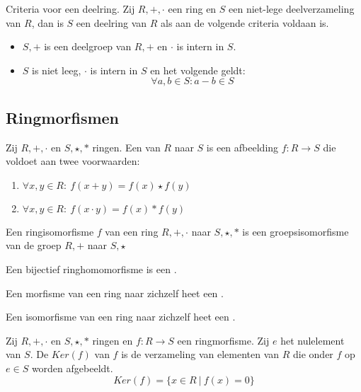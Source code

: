 \documentclass[main.tex]{subfiles}
\begin{document}
\begin{st}
  \label{st:deelring-criteria}
  Criteria voor een deelring.
  Zij $R,+,\cdot$ een ring en $S$ een niet-lege deelverzameling van $R$, dan is $S$ een deelring van $R$ als aan de volgende criteria voldaan is.
  \begin{itemize}
  \item $S,+$ is een deelgroep van $R,+$ en $\cdot$ is intern in $S$.
  \item $S$ is niet leeg, $\cdot$ is intern in $S$ en het volgende geldt:
    \[ \forall a,b \in S: a - b \in S \]
  \end{itemize}
\end{st}

\subsection{Ringmorfismen}
\label{sec:ringmorfismen}

\begin{de}
  Zij $R,+,\cdot$ en $S,\star,*$ ringen.
  Een  van $R$ naar $S$ is een afbeelding $f: R\rightarrow S$ die voldoet aan twee voorwaarden:
  \begin{enumerate}
  \item $\forall x,y \in R:\ f(x + y) = f(x) \star f(y)$
  \item $\forall x,y \in R:\ f(x \cdot y) = f(x) * f(y)$
  \end{enumerate}
\end{de}

\begin{opm}
  Een ringisomorfisme $f$ van een ring $R,+,\cdot$ naar $S,\star,*$ is een groepsisomorfisme van de groep $R,+$ naar $S,\star$
\end{opm}

\begin{de}
  Een bijectief ringhomomorfisme is een .
\end{de}

\begin{de}
  Een morfisme van een ring naar zichzelf heet een .
\end{de}

\begin{de}
  Een isomorfisme van een ring naar zichzelf heet een .
\end{de}

\begin{de}
  Zij $R,+,\cdot$ en $S,\star,*$ ringen en $f:R \rightarrow S$ een ringmorfisme.
  Zij $e$ het nulelement van $S$.
  De  $Ker(f)$ van $f$ is de verzameling van elementen van $R$ die onder $f$ op $e\in S$ worden afgebeeldt.
  \[ Ker(f) = \{ x \in R \ |\ f(x) = 0 \} \]
\end{de}
\end{document}
